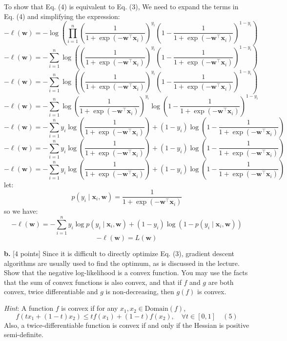 \documentclass[a3paper,12pt]{extarticle} %
\begin{document}
To show that Eq. (4) is equivalent to Eq. (3), We need to expand the terms in Eq. (4) and simplifying the expression:
\[
-\ell(\mathbf{w}) = -\log \left( \prod_{i=1}^n \left( \frac{1}{1 + \exp(-\mathbf{w}^\top \mathbf{x}_i)} \right)^{y_i} \left( 1 - \frac{1}{1 + \exp(-\mathbf{w}^\top \mathbf{x}_i)} \right)^{1 - y_i} \right)
\]
\[
-\ell(\mathbf{w}) = -\sum_{i=1}^n \log \left( \left( \frac{1}{1 + \exp(-\mathbf{w}^\top \mathbf{x}_i)} \right)^{y_i} \left( 1 - \frac{1}{1 + \exp(-\mathbf{w}^\top \mathbf{x}_i)} \right)^{1 - y_i} \right)
\]
\[
-\ell(\mathbf{w}) = -\sum_{i=1}^n \log \left( \left( \frac{1}{1 + \exp(-\mathbf{w}^\top \mathbf{x}_i)} \right)^{y_i} \left( 1 - \frac{1}{1 + \exp(-\mathbf{w}^\top \mathbf{x}_i)} \right)^{1 - y_i} \right)
\]
\[
-\ell(\mathbf{w}) = -\sum_{i=1}^n \log \left( \frac{1}{1 + \exp(-\mathbf{w}^\top \mathbf{x}_i)} \right)^{y_i} \log \left( 1 - \frac{1}{1 + \exp(-\mathbf{w}^\top \mathbf{x}_i)} \right)^{1 - y_i}
\]
\[
-\ell(\mathbf{w}) = -\sum_{i=1}^n y_i \log \left( \frac{1}{1 + \exp(-\mathbf{w}^\top \mathbf{x}_i)} \right) + (1 - y_i) \log \left( 1 - \frac{1}{1 + \exp(-\mathbf{w}^\top \mathbf{x}_i)}\right)
\]
\[
-\ell(\mathbf{w}) = -\sum_{i=1}^n y_i \log \left( \frac{1}{1 + \exp(-\mathbf{w}^\top \mathbf{x}_i)} \right) + (1 - y_i) \log \left( 1 - \frac{1}{1 + \exp(-\mathbf{w}^\top \mathbf{x}_i)} \right)
\]
\[
-\ell(\mathbf{w}) = -\sum_{i=1}^n y_i \log \left( \frac{1}{1 + \exp(-\mathbf{w}^\top \mathbf{x}_i)} \right) + (1 - y_i) \log \left( 1 - \frac{1}{1 + \exp(-\mathbf{w}^\top \mathbf{x}_i)} \right)
\]
let:
\[
p(y_i \mid \mathbf{x}_i, \mathbf{w}) = \frac{1}{1 + \exp(-\mathbf{w}^\top \mathbf{x}_i)}
\]
so we have:
\[
-\ell(\mathbf{w}) = -\sum_{i=1}^n y_i \log p(y_i \mid \mathbf{x}_i, \mathbf{w}) + (1 - y_i) \log (1 - p(y_i \mid \mathbf{x}_i, \mathbf{w}))
\]
\[
-\ell(\mathbf{w}) = L(\mathbf{w})
\]

\textbf{b.} [4 points] Since it is difficult to directly optimize Eq. (3), gradient descent algorithms are usually used to find the optimum, as is discussed in the lecture. Show that the negative log-likelihood is a convex function. You may use the facts that the sum of convex functions is also convex, and that if $f$ and $g$ are both convex, twice differentiable and $g$ is non-decreasing, then $g(f)$ is convex.

\textit{Hint}: A function $f$ is convex if for any $x_1, x_2 \in \text{Domain}(f)$,
\[
f(tx_1 + (1 - t)x_2) \leq t f(x_1) + (1 - t) f(x_2), \quad \forall t \in [0, 1] \quad (5)
\]
Also, a twice-differentiable function is convex if and only if the Hessian is positive semi-definite.
\end{document}
